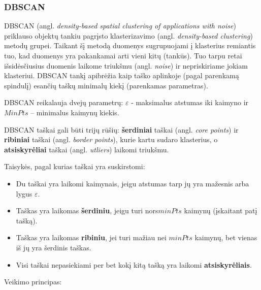\documentclass{VUMIFInfKursinis}
\newcommand{\ltang}[2]{#1 (angl. \textit{#2})}
\begin{document}
\subsubsection{DBSCAN}

\ltang{DBSCAN}{density-based spatial clustering of applications with
noise} \cite{ester1996density} priklauso objektų \ltang{tankiu pagrįsto klasterizavimo}{density-based clustering}
metodų grupei. Taikant šį metodą
duomenys sugrupuojami į klasterius remiantis tuo, kad duomenys yra
pakankamai arti vieni kitų (tankūs). Tuo tarpu retai išsidėsčiusius
duomenis laikome \ltang{triukšmu}{noise}   ir nepriskiriame jokiam
klasteriui. DBSCAN tankį apibrėžia kaip taško aplinkoje (pagal parenkamą
spindulį) esančių taškų minimalų kiekį (parenkamas parametras).

DBSCAN reikalauja dvejų parametrų: $ε$ - maksimalus atstumas iki kaimyno
ir $MinPts$ – minimalus kaimynų kiekis.

DBSCAN taškai gali būti trijų rūšių: \ltang{\textbf{šerdiniai} taškai}{core points}
ir \ltang{\textbf{ribiniai} taškai}{border points}, kurie kartu sudaro klasterius,
 o \ltang{\textbf{atsiskyrėliai} taškai}{utliers} laikomi triukšmu.

Taisykės, pagal kurias taškai yra suskirstomi:

\begin{itemize}
\item
  Du taškai yra laikomi kaimynais, jeigu atstumas tarp jų yra mažesnis
  arba lygus $ε$.
\item
  Taškas yra laikomas \textbf{šerdiniu}, jeigu turi nors$minPts$
  kaimynų (įskaitant patį tašką).
\item
  Taškas yra laikomas \textbf{ribiniu}, jei turi mažiau nei
  $minPts$ kaimynų, bet vienas iš jų yra šerdinis taškas. 
\item
  Visi taškai nepasiekiami per bet kokį kitą tašką yra laikomi
  \textbf{atsiskyrėliais}.
\end{itemize}

Veikimo principas:
\end{document}

